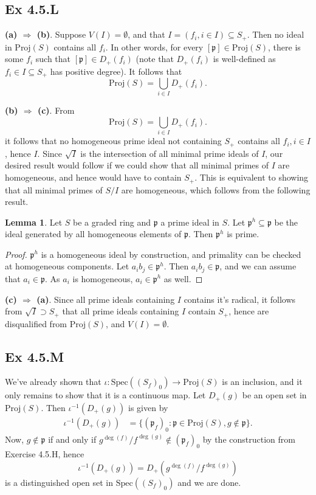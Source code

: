 \documentclass{article}
\theoremstyle{definition}
\newtheorem{lemma}[theorem]{Lemma}
\newcommand{\Spec}{\text{Spec}}
\newcommand{\Proj}{\text{Proj}}
\begin{document}
\subsection*{Ex 4.5.L}

\textbf{(a) $\Rightarrow$ (b)}. Suppose $V(I) = \emptyset$, and that $I = (f_i,
	i \in I) \subseteq S_{+}$. Then no ideal in $\Proj(S)$ contains all $f_i$. In
other words, for every $[\mathfrak{p}] \in \Proj(S)$, there is some $f_i$ such
that $[\mathfrak{p}] \in D_{+}(f_i)$ (note that $D_{+}(f_i)$ is well-defined as
$f_i \in I \subseteq S_{+}$ has positive degree). It follows that
\[
	\Proj(S) = \bigcup_{i \in I}D_{+}(f_i).
\]

\textbf{(b) $\Rightarrow$ (c)}. From
\[
	\Proj(S) = \bigcup_{i \in I}D_{+}(f_i).
\]
it follows that no homogeneous prime ideal not containing $S_{+}$ contains all
$f_i, i \in I$, hence $I$. Since $\sqrt{I}$ is the intersection of all minimal
prime ideals of $I$, our desired result would follow if we could show that all
minimal primes of $I$ are homogeneous, and hence would have to contain $S_{+}$.
This is equivalent to showing that all minimal primes of $S/I$ are homogeneous,
which follows from the following result.

\begin{lemma}
	Let $S$ be a graded ring and $\mathfrak{p}$	a prime ideal in $S$.
	Let $\mathfrak{p}^{h} \subseteq \mathfrak{p}$ be the ideal generated
	by all homogeneous elements of $\mathfrak{p}$. Then $\mathfrak{p}^{h}$
	is prime.
\end{lemma}
\begin{proof}
	$\mathfrak{p}^{h}$ is a homogeneous ideal by construction, and primality
	can be checked at homogeneous components. Let $a_i b_j \in
		\mathfrak{p}^{h}$. Then $a_i b_j \in \mathfrak{p}$, and we can assume that
	$a_i \in \mathfrak{p}$. As $a_i$ is homogeneous, $a_i \in \mathfrak{p}^{h}$
	as well.
\end{proof}

\textbf{(c) $\Rightarrow$ (a)}. Since all prime ideals containing $I$ contains
it's radical, it follows from $\sqrt{I} \supset S_{+}$ that all prime ideals
containing $I$ contain $S_{+}$, hence are disqualified from $\Proj(S)$, and
$V(I) = \emptyset$.

\subsection*{Ex 4.5.M}

We've already shown that $\iota : \Spec((S_f)_0) \to \Proj(S)$ is an inclusion,
and it only remains to show that it is a continuous map. Let $D_{+}(g)$ be an
open set in $\Proj(S)$. Then $\iota^{-1}(D_{+}(g))$ is given by
\begin{align*}
	\iota^{-1}(D_{+}(g))
	 & =
	\{
	(\mathfrak{p}_f)_{0}
	:
	\mathfrak{p} \in \Proj(S),
	g \not \in \mathfrak{p}
	\}.
\end{align*}
Now, $g \not \in \mathfrak{p}$ if and only if $g^{\deg(f)}/f^{\deg(g)} \not \in
	(\mathfrak{p}_f)_0$ by the construction from Exercise 4.5.H, hence
\[
	\iota^{-1}(D_{+}(g))
	=
	D_{+}(g^{\deg(f)}/f^{\deg(g)})
\]
is a distinguished open set in $\Spec((S_f)_0)$ and we are done.
\end{document}
